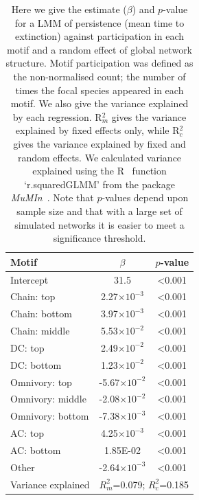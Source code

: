 \documentclass[12pt]{article}
\begin{document}
		\begin{table}[hb!]
    		\caption{Here we give the estimate ($\beta$) and $p$-value for a LMM of persistence (mean time to extinction) against participation in each motif and a random effect of global network structure. Motif participation was defined as the non-normalised count; the number of times the focal species appeared in each motif. We also give the variance explained by each regression. R$^{2}_{m}$ gives the variance explained by fixed effects only, while R$^{2}_{c}$ gives the variance explained by fixed and random effects. We calculated variance explained using the R~\citep{R} function `r.squaredGLMM' from the package \emph{MuMIn}~\citep{MuMIn}. Note that $p$-values depend upon sample size and that with a large set of simulated networks it is easier to meet a significance threshold.}
    		\label{tab:count_positions}
    		\begin{tabular}{l | c c}
    		Motif & $\beta$ & $p$-value \\  
    		\hline
            Intercept	&	31.5	&	\textless0.001	\\
            Chain: top	&	2.27$\times10^{-3}$	&	\textless0.001	\\
            Chain: bottom	&	3.97$\times10^{-3}$	&	\textless0.001	\\
            Chain: middle	&	5.53$\times10^{-2}$	&	\textless0.001	\\
            DC: top	&	2.49$\times10^{-2}$	&	\textless0.001	\\
            DC: bottom	&	1.23$\times10^{-2}$	&	\textless0.001	\\
            Omnivory: top	&	-5.67$\times10^{-2}$	&	\textless0.001	\\
            Omnivory: middle	&	-2.08$\times10^{-2}$	&	\textless0.001	\\
            Omnivory: bottom	&	-7.38$\times10^{-3}$	&	\textless0.001	\\
            AC: top	&	4.25$\times10^{-3}$	&	\textless0.001	\\
            AC: bottom	&	1.85E-02	&	\textless0.001	\\
            Other	&	-2.64$\times10^{-3}$	&	\textless0.001	\\
            \hline
    		Variance explained & \multicolumn{2}{c}{$R^{2}_m$=0.079; $R^2_c$=0.185} \\
    		\hline
    		\end{tabular}
    		\end{table}
\end{document}
